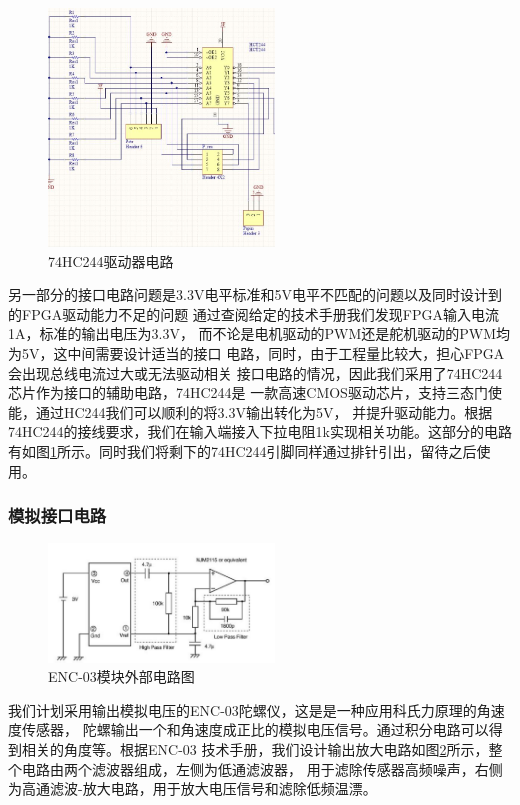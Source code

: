 \documentclass[a4paper]{paper}
\begin{document}
\begin{figure}
    \centering
    \includegraphics[width =60mm]{../preview/motor0.jpg}
    \caption{74HC244驱动器电路}
    \label{motor0}
\end{figure}
另一部分的接口电路问题是3.3V电平标准和5V电平不匹配的问题以及同时设计到的FPGA驱动能力不足的问题
通过查阅给定的技术手册我们发现FPGA输入电流1A，标准的输出电压为3.3V，
而不论是电机驱动的PWM还是舵机驱动的PWM均为5V，这中间需要设计适当的接口
电路，同时，由于工程量比较大，担心FPGA会出现总线电流过大或无法驱动相关
接口电路的情况，因此我们采用了74HC244芯片作为接口的辅助电路，74HC244是
一款高速CMOS驱动芯片，支持三态门使能，通过HC244我们可以顺利的将3.3V输出转化为5V，
并提升驱动能力。根据74HC244的接线要求，我们在输入端接入下拉电阻1k实现相关功能。这部分的电路
有如图\ref{motor0}所示。同时我们将剩下的74HC244引脚同样通过排针引出，留待之后使用。

\subsubsection{模拟接口电路}
\begin{figure}
    \centering
    \includegraphics[width = 60mm]{../preview/enc.jpg}
    \caption{ENC-03模块外部电路图}
    \label{ENC}
\end{figure}
我们计划采用输出模拟电压的ENC-03陀螺仪，这是是一种应用科氏力原理的角速度传感器，
陀螺输出一个和角速度成正比的模拟电压信号。通过积分电路可以得到相关的角度等。根据ENC-03
技术手册，我们设计输出放大电路如图\ref{ENC}所示，整个电路由两个滤波器组成，左侧为低通滤波器，
用于滤除传感器高频噪声，右侧为高通滤波-放大电路，用于放大电压信号和滤除低频温漂。
\end{document}
